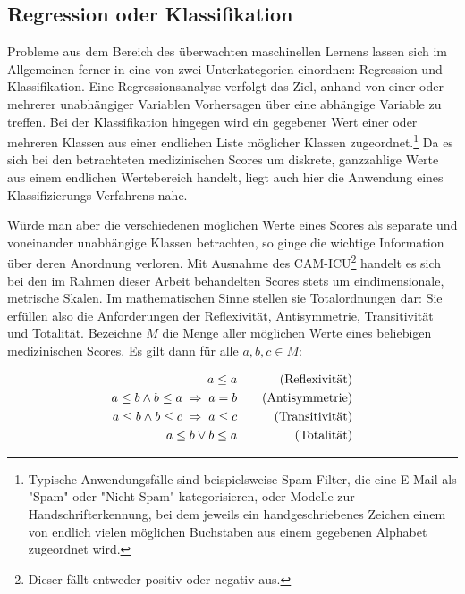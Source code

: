 \subsection{Regression oder Klassifikation}\label{section:regrvsclf}
Probleme aus dem Bereich des überwachten maschinellen Lernens lassen sich im Allgemeinen ferner in eine von zwei Unterkategorien einordnen: Regression und Klassifikation. Eine Regressionsanalyse verfolgt das Ziel, anhand von einer oder mehrerer unabhängiger Variablen Vorhersagen über eine abhängige Variable zu treffen. Bei der Klassifikation hingegen wird ein gegebener Wert einer oder mehreren Klassen aus einer endlichen Liste möglicher Klassen zugeordnet.\footnote{Typische Anwendungsfälle sind beispielsweise Spam-Filter, die eine E-Mail als "Spam" oder "Nicht Spam" kategorisieren, oder Modelle zur Handschrifterkennung, bei dem jeweils ein handgeschriebenes Zeichen einem von endlich vielen möglichen Buchstaben aus einem gegebenen Alphabet zugeordnet wird.}
Da es sich bei den betrachteten medizinischen Scores um diskrete, ganzzahlige Werte aus einem endlichen Wertebereich handelt, liegt auch hier die Anwendung eines Klassifizierungs-Verfahrens nahe.

Würde man aber die verschiedenen möglichen Werte eines Scores als separate und voneinander unabhängige Klassen betrachten, so ginge die wichtige Information über deren Anordnung verloren. Mit Ausnahme des CAM-ICU\footnote{Dieser fällt entweder positiv oder negativ aus.} handelt es sich bei den im Rahmen dieser Arbeit behandelten Scores stets um eindimensionale, metrische Skalen. Im mathematischen Sinne stellen sie Totalordnungen dar: Sie erfüllen also die Anforderungen der Reflexivität, Antisymmetrie, Transitivität und Totalität. Bezeichne $M$ die Menge aller möglichen Werte eines beliebigen medizinischen Scores. Es gilt dann für alle $a,b,c \in M$:

\begin{equation*}
    \centering
    \begin{aligned}[c]
        a \leq a\\
        a \leq b \land b \leq a \; \Rightarrow \; a=b\\
        a \leq b \land b \leq c \; \Rightarrow \; a \leq c\\
        a \leq b \lor b \leq a
    \end{aligned}
    \qquad
    \begin{aligned}[c]
        \text{(Reflexivität)}\\
        \text{(Antisymmetrie)}\\
        \text{(Transitivität)}\\
        \text{(Totalität)}
    \end{aligned}
\end{equation*}

